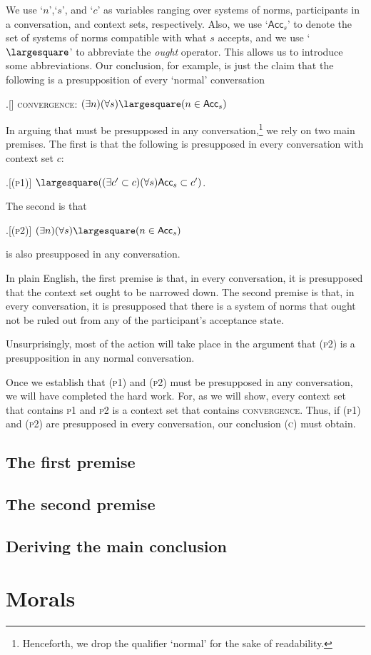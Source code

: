 \documentclass[11pt,article,oneside]{memoir}
\newcommand{\ought}{\largesquare}
\begin{document}
We use `$n$',`$s$', and `$c$' as variables ranging over systems of norms, participants in a conversation, and context sets, respectively. Also, we use `$\mathsf{Acc}_s$' to denote the set of systems of norms compatible with what $s$ accepts, and we use `$\ought$' to abbreviate the \emph{ought} operator. This allows us to introduce some abbreviations. Our conclusion, for example, is just the claim that the following is a presupposition of every `normal' conversation

\ex.[] \textsc{convergence}: $(\exists n)(\forall s) \ought (n \in \mathsf{Acc}_s)$


In arguing that \Last must be presupposed in any conversation,\footnote{Henceforth, we drop the qualifier `normal' for the sake of readability.} we rely on two main premises. The first is that the following is presupposed in every conversation with context set $c$:

\ex.[(\textsc{p1})] $\ought ((\exists c' \subset c)(\forall s)\mathsf{Acc}_s \subset c')$.

The second is that 

\ex.[(\textsc{p2})] $(\exists n)(\forall s)\ought(n \in \mathsf{Acc}_s)$

is also presupposed in any conversation. 

In plain English, the first premise is that, in every conversation, it is presupposed that the context set ought to be narrowed down. The second premise is that, in every conversation, it is presupposed that there is a system of norms that ought not be ruled out from any of the participant's acceptance state. 

Unsurprisingly, most of the action will take place in the argument that (\textsc{p2}) is a presupposition in any normal conversation. 

Once we establish that (\textsc{p1}) and (\textsc{p2}) must be presupposed in any conversation, we will have completed the hard work. For, as we will show, every context set that contains \textsc{p1} and \textsc{p2} is a context set that contains \textsc{convergence}. Thus, if (\textsc{p1}) and (\textsc{p2}) are presupposed in every conversation, our conclusion (\textsc{c}) must obtain. 

\subsection{The first premise}

\subsection{The second premise}

\subsection{Deriving the main conclusion}



\section{Morals}\label{dragon}

 

\printbibliography
\end{document}
